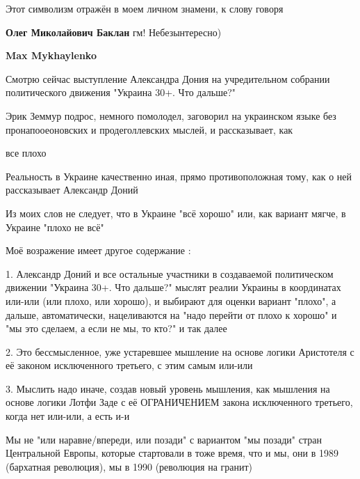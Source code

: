 \begin{itemize}
Этот символизм отражён в моем личном знамени, к слову говоря

\begin{itemize}
 

\textbf{Олег Миколайович Баклан} гм! Небезынтересно)

 
\textbf{Max Mykhaylenko} 

Смотрю сейчас выступление Александра Дония на учредительном собрании
политического движения "Украина 30+. Что дальше?"

Эрик Земмур подрос, немного помолодел, заговорил на украинском языке без
пронапооеоновских и продеголлевских мыслей, и рассказывает, как

все плохо \Smiley[1.0][yellow]

Реальность в Украине качественно иная, прямо противоположная тому, как о ней
рассказывает Александр Доний

Из моих слов не следует, что в Украине "всё хорошо" или, как вариант мягче, в Украине "плохо не всё"

Моё возражение имеет другое содержание :

1. Александр Доний и все остальные участники в создаваемой политическом
движении "Украина 30+. Что дальше?" мыслят реалии Украины в координатах или-или
(или плохо, или хорошо), и выбирают для оценки вариант "плохо", а дальше,
автоматически, нацеливаются на "надо перейти от плохо к хорошо" и "мы это
сделаем, а если не мы, то кто?" и так далее

2. Это бессмысленное, уже устаревшее мышление на основе логики Аристотеля с её законом исключенного третьего, с этим самым или-или

3. Мыслить надо иначе, создав новый уровень мышления, как мышления на основе
логики Лотфи Заде с её ОГРАНИЧЕНИЕМ закона исключенного третьего, когда нет
или-или, а есть и-и

Мы не "или наравне/впереди, или позади" с вариантом "мы позади" стран
Центральной Европы, которые стартовали в тоже время, что и мы, они в 1989
(бархатная революция), мы в 1990 (революция на гранит)


\end{itemize}
\end{itemize}
